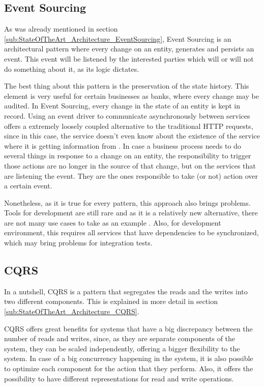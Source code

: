 \subsection{Event Sourcing}
As was already mentioned in section \ref{sub:StateOfTheArt_Architecture_EventSourcing}, Event Sourcing is an architectural pattern where every change on an entity, generates and persists an event. This event will be listened by the interested parties which will or will not do something about it, as its logic dictates.
\par
The best thing about this pattern is the preservation of the state history. This element is very useful for certain businesses as banks, where every change may be audited. In Event Sourcing, every change in the state of an entity is kept in record. Using an event driver to communicate asynchronously between services offers a extremely loosely coupled alternative to the traditional \gls{HTTP} requests, since in this case, the service doesn't even know about the existence of the service where it is getting information from \parencite{eventDrivenArchitectureOverview}. In case a business process needs to do several things in response to a change on an entity, the responsibility to trigger those actions are no longer in the source of that change, but on the services that are listening the event. They are the ones responsible to take (or not) action over a certain event.
\par
Nonetheless, as it is true for every pattern, this approach also brings problems. Tools for development are still rare and as it is a relatively new alternative, there are not many use cases to take as an example \parencite{prosAndConsEventSourcing}. Also, for development environment, this requires all services that have dependencies to be synchronized, which may bring problems for integration tests.

\subsection{CQRS}
In a nutshell, \gls{CQRS} is a pattern that segregates the reads and the writes into two different components. This is explained in more detail in section \ref{sub:StateOfTheArt_Architecture_CQRS}.
\par 

\gls{CQRS} offers great benefits for systems that have a big discrepancy between the number of reads and writes, since, as they are separate components of the system, they can be scaled independently, offering a bigger flexibility to the system. In case of a big concurrency happening in the system, it is also possible to optimize each component for the action that they perform. Also, it offers the possibility to have different representations for read and write operations.

